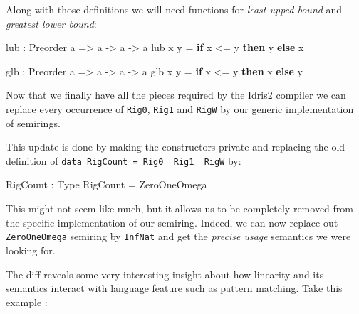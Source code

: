 \documentclass[
]{article}
\newenvironment{Shaded}{}{}
\newcommand{\DataTypeTok}[1]{\textcolor[rgb]{0.56,0.13,0.00}{#1}}
\newcommand{\KeywordTok}[1]{\textcolor[rgb]{0.00,0.44,0.13}{\textbf{#1}}}
\newcommand{\NormalTok}[1]{#1}
\newcommand{\OperatorTok}[1]{\textcolor[rgb]{0.40,0.40,0.40}{#1}}
\newcommand{\OtherTok}[1]{\textcolor[rgb]{0.00,0.44,0.13}{#1}}
\begin{document}
Along with those definitions we will need functions for \emph{least
upped bound} and \emph{greatest lower bound}:

\begin{Shaded}
\begin{Highlighting}[]
\NormalTok{lub }\OperatorTok{:} \DataTypeTok{Preorder}\NormalTok{ a }\OtherTok{=\textgreater{}}\NormalTok{ a }\OtherTok{{-}\textgreater{}}\NormalTok{ a }\OtherTok{{-}\textgreater{}}\NormalTok{ a}
\NormalTok{lub x y }\OtherTok{=} \KeywordTok{if}\NormalTok{ x }\OperatorTok{\textless{}=}\NormalTok{ y }\KeywordTok{then}\NormalTok{ y }\KeywordTok{else}\NormalTok{ x}

\NormalTok{glb }\OperatorTok{:} \DataTypeTok{Preorder}\NormalTok{ a }\OtherTok{=\textgreater{}}\NormalTok{ a }\OtherTok{{-}\textgreater{}}\NormalTok{ a }\OtherTok{{-}\textgreater{}}\NormalTok{ a}
\NormalTok{glb x y }\OtherTok{=} \KeywordTok{if}\NormalTok{ x }\OperatorTok{\textless{}=}\NormalTok{ y }\KeywordTok{then}\NormalTok{ x }\KeywordTok{else}\NormalTok{ y}
\end{Highlighting}
\end{Shaded}

Now that we finally have all the pieces required by the Idris2 compiler
we can replace every occurrence of \texttt{Rig0}, \texttt{Rig1} and
\texttt{RigW} by our generic implementation of semirings.

This update is done by making the constructors private and replacing the
old definition of
\texttt{data\ RigCount\ =\ Rig0\ \textbar{}\ Rig1\ \textbar{}\ RigW} by:

\begin{Shaded}
\begin{Highlighting}[]
\DataTypeTok{RigCount} \OperatorTok{:} \DataTypeTok{Type}
\DataTypeTok{RigCount} \OtherTok{=} \DataTypeTok{ZeroOneOmega}
\end{Highlighting}
\end{Shaded}

This might not seem like much, but it allows us to be completely removed
from the specific implementation of our semiring. Indeed, we can now
replace out \texttt{ZeroOneOmega} semiring by \texttt{InfNat} and get
the \emph{precise usage} semantics we were looking for.

The diff reveals some very interesting insight about how linearity and
its semantics interact with language feature such as pattern matching.
Take this example :
\end{document}
